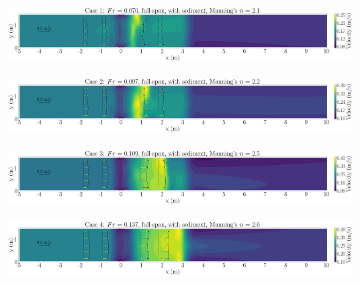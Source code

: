\documentclass[preview, border=2pt]{standalone}
\begin{document}
\begin{figure}
     \centering
     \begin{subfigure}[b]{0.95\textwidth}
         \centering
         \caption{}
         \includegraphics[width=\textwidth]{exp_vel_mag_contour_ManningN_0001.png}
     \end{subfigure}
     \hfill     
     \begin{subfigure}[b]{0.95\textwidth}
         \centering
         \caption{}
         \includegraphics[width=\textwidth]{exp_vel_mag_contour_ManningN_0002.png}
     \end{subfigure}
     \hfill     
     \begin{subfigure}[b]{0.95\textwidth}
         \centering
         \caption{}
         \includegraphics[width=\textwidth]{exp_vel_mag_contour_ManningN_0003.png}
     \end{subfigure}
     \hfill     
     \begin{subfigure}[b]{0.95\textwidth}
         \centering
         \caption{}
         \includegraphics[width=\textwidth]{exp_vel_mag_contour_ManningN_0004.png}
     \end{subfigure}     
\end{figure}
\end{document}
